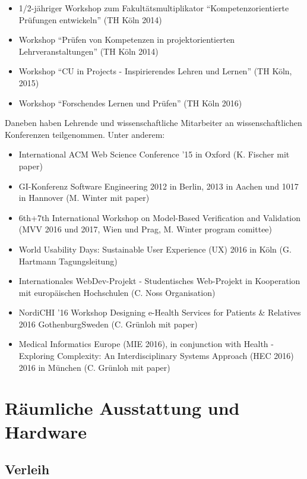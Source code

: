\begin{itemize}
\tightlist
\item
  1/2-jähriger Workshop zum Fakultätsmultiplikator
  ``Kompetenzorientierte Prüfungen entwickeln'' (TH Köln 2014)
\item
  Workshop ``Prüfen von Kompetenzen in projektorientierten
  Lehrveranstaltungen'' (TH Köln 2014)
\item
  Workshop ``CU in Projects - Inspirierendes Lehren und Lernen'' (TH
  Köln, 2015)
\item
  Workshop ``Forschendes Lernen und Prüfen'' (TH Köln 2016)
\end{itemize}

Daneben haben Lehrende und wissenschaftliche Mitarbeiter an
wissenschaftlichen Konferenzen teilgenommen. Unter anderem:

\begin{itemize}
\tightlist
\item
  International ACM Web Science Conference '15 in Oxford (K. Fischer mit
  paper)
\item
  GI-Konferenz Software Engineering 2012 in Berlin, 2013 in Aachen und
  1017 in Hannover (M. Winter mit paper)
\item
  6th+7th International Workshop on Model-Based Verification and
  Validation (MVV 2016 und 2017, Wien und Prag, M. Winter program
  comittee)
\item
  World Usability Days: Sustainable User Experience (UX) 2016 in Köln
  (G. Hartmann Tagungsleitung)
\item
  Internationales WebDev-Projekt - Studentisches Web-Projekt in
  Kooperation mit europäischen Hochschulen (C. Noss Organisation)
\item
  NordiCHI '16 Workshop Designing e-Health Services for Patients \&
  Relatives 2016 GothenburgSweden (C. Grünloh mit paper)
\item
  Medical Informatics Europe (MIE 2016), in conjunction with Health -
  Exploring Complexity: An Interdisciplinary Systems Approach (HEC 2016)
  2016 in München (C. Grünloh mit paper)
\end{itemize}

\section{Räumliche Ausstattung und
Hardware}\label{ruxe4umliche-ausstattung-und-hardware}

\subsection{Verleih}\label{verleih}

